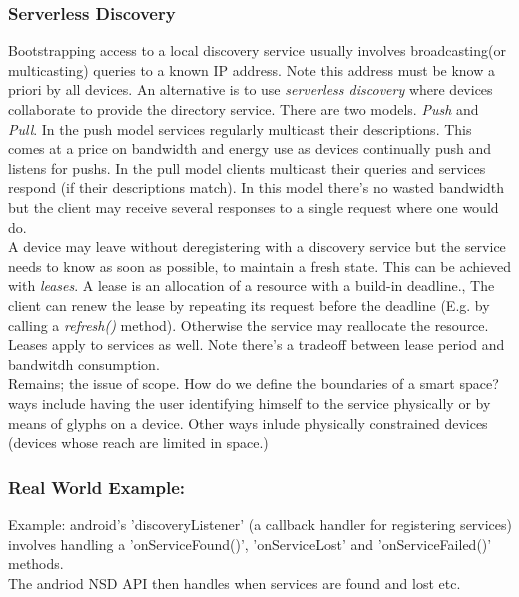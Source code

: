\subsubsection{Serverless Discovery}
Bootstrapping access to a local discovery service usually involves broadcasting(or multicasting) queries to a known IP address. Note this address must be know a priori by all devices. An alternative is to use \textit{serverless discovery} where devices collaborate to provide the directory service. There are two models. \textit{Push} and \textit{Pull}. In the push model services regularly multicast their descriptions. This comes at a price on bandwidth and energy use as devices continually push and listens for pushs. In the pull model clients multicast their queries and services respond (if their descriptions  match). In this model there's no wasted bandwidth but the client may receive several responses to a single request where one would do.\\

A device may leave without deregistering with a discovery service but the service needs to know as soon as possible, to maintain a fresh state. This can be achieved with \textit{leases}. A lease is an allocation of a resource with a build-in deadline., The client can renew the lease by repeating its request before the deadline (E.g. by calling a \textit{refresh()} method). Otherwise the service may reallocate the resource. Leases apply to services as well. Note there's a tradeoff between lease period and bandwitdh consumption.          \\

Remains; the issue of scope. How do we define the boundaries of a smart space? ways include having the user identifying himself to the service physically or by means of glyphs on a device. Other ways inlude physically constrained devices (devices whose reach are limited in space.) \\ 


\subsubsection{Real World Example:}
Example: android's 'discoveryListener' (a callback handler for registering services) involves handling a 'onServiceFound()', 'onServiceLost' and  'onServiceFailed()' methods.\\

The andriod NSD API then handles when services are found and lost etc.\\

